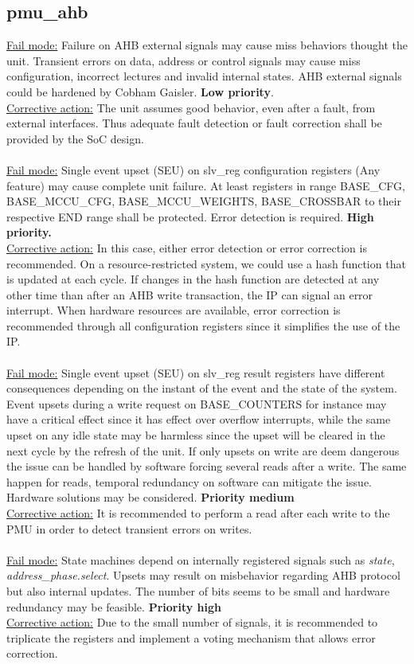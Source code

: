 \subsection{pmu\_ahb}
\underline{Fail mode:} Failure on AHB external signals may cause miss behaviors thought the unit. Transient errors on data, address or control signals may cause miss configuration, incorrect lectures and invalid internal states. AHB external signals could be hardened by Cobham Gaisler. \textbf{Low priority}.\\
\underline{Corrective action:} The unit assumes good behavior, even after a fault, from external interfaces. Thus adequate fault detection or fault correction shall be provided by the SoC design.\\
\\
\underline{Fail mode:} Single event upset (SEU) on slv\_reg configuration registers (Any feature) may cause complete unit failure. At least registers in range BASE\_CFG, BASE\_MCCU\_CFG, BASE\_MCCU\_WEIGHTS, BASE\_CROSSBAR to their respective END range shall be protected. Error detection is required. \textbf{High priority.}\\
\underline{Corrective action:} In this case, either error detection or error correction is recommended. On a resource-restricted system, we could use a hash function that is updated at each cycle. If changes in the hash function are detected at any other time than after an AHB write transaction, the IP can signal an error interrupt.  When hardware resources are available, error correction is recommended through all configuration registers since it simplifies the use of the IP.\\
\\
\underline{Fail mode:} Single event upset (SEU) on slv\_reg result registers have different consequences depending on the instant of the event and the state of the system. Event upsets during a write request on BASE\_COUNTERS for instance may have a critical effect since it has effect over overflow interrupts, while the same upset on any idle state may be harmless since the upset will be cleared in the next cycle by the refresh of the unit. If only upsets on write are deem dangerous the issue can be handled by software forcing several reads after a write. The same happen for reads, temporal redundancy on software can mitigate the issue. Hardware solutions may be considered. \textbf{Priority medium}\\
\underline{Corrective action:} It is recommended to perform a read after each write to the PMU in order to detect transient errors on writes.\\
\\
\underline{Fail mode:} State machines depend on internally registered signals such as \textit{ state}, \textit{address\_phase.select}. Upsets may result on misbehavior regarding AHB protocol but also  internal updates. The number of bits seems to be small and hardware redundancy may be feasible. \textbf{Priority high}\\
\underline{Corrective action:} Due to the small number of signals, it is recommended to triplicate the registers and implement a voting mechanism that allows error correction.\\
 

